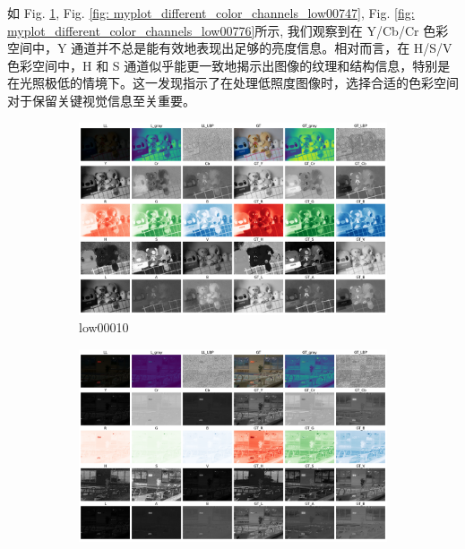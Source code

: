 \documentclass[a4paper]{ctexart}
\begin{document}
		如 Fig. \ref{fig: myplot_different_color_channels_low00010}, Fig. \ref{fig: myplot_different_color_channels_low00747}, Fig. \ref{fig: myplot_different_color_channels_low00776}所示, 我们观察到在 Y/Cb/Cr 色彩空间中，Y 通道并不总是能有效地表现出足够的亮度信息。相对而言，在 H/S/V 色彩空间中，H 和 S 通道似乎能更一致地揭示出图像的纹理和结构信息，特别是在光照极低的情境下。这一发现指示了在处理低照度图像时，选择合适的色彩空间对于保留关键视觉信息至关重要。
		
		\begin{figure}[htbp]
			\centering
			\begin{subfigure}{0.3\textwidth}
				\includegraphics[width=\linewidth]{picture/LLIE/Experiment/myplot_different_color_channels_low00010}
				\captionsetup{font=scriptsize}
				\caption{low00010}
				\label{fig: myplot_different_color_channels_low00010}	
			\end{subfigure}
			\begin{subfigure}{0.3\textwidth}
				\includegraphics[width=\linewidth]{picture/LLIE/Experiment/myplot_different_color_channels_low00747}

\end{subfigure}
\end{figure}
\end{document}
